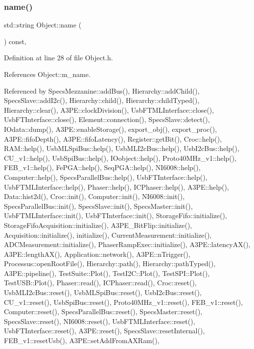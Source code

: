 \subsubsection{\texorpdfstring{name()}{name()}}
{\footnotesize\ttfamily std\+::string Object\+::name (\begin{DoxyParamCaption}{ }\end{DoxyParamCaption}) const\hspace{0.3cm}{\ttfamily [inline]}, {\ttfamily [inherited]}}



Definition at line 28 of file Object.\+h.



References Object\+::m\+\_\+name.



Referenced by Specs\+Mezzanine\+::add\+Bus(), Hierarchy\+::add\+Child(), Specs\+Slave\+::add\+I2c(), Hierarchy\+::child(), Hierarchy\+::child\+Typed(), Hierarchy\+::clear(), A3\+P\+E\+::clock\+Division(), Usb\+F\+T\+M\+L\+Interface\+::close(), Usb\+F\+T\+Interface\+::close(), Element\+::connection(), Specs\+Slave\+::detect(), I\+Odata\+::dump(), A3\+P\+E\+::enable\+Storage(), export\+\_\+obj(), export\+\_\+proc(), A3\+P\+E\+::fifo\+Depth(), A3\+P\+E\+::fifo\+Latency(), Register\+::get\+Bit(), Croc\+::help(), R\+A\+M\+::help(), Usb\+M\+L\+Spi\+Bus\+::help(), Usb\+M\+L\+I2c\+Bus\+::help(), Usb\+I2c\+Bus\+::help(), C\+U\+\_\+v1\+::help(), Usb\+Spi\+Bus\+::help(), I\+Oobject\+::help(), Proto40\+M\+Hz\+\_\+v1\+::help(), F\+E\+B\+\_\+v1\+::help(), Fe\+P\+G\+A\+::help(), Seq\+P\+G\+A\+::help(), N\+I6008\+::help(), Computer\+::help(), Specs\+Parallel\+Bus\+::help(), Usb\+F\+T\+Interface\+::help(), Usb\+F\+T\+M\+L\+Interface\+::help(), Phaser\+::help(), I\+C\+Phaser\+::help(), A3\+P\+E\+::help(), Data\+::hist2d(), Croc\+::init(), Computer\+::init(), N\+I6008\+::init(), Specs\+Parallel\+Bus\+::init(), Specs\+Slave\+::init(), Specs\+Master\+::init(), Usb\+F\+T\+M\+L\+Interface\+::init(), Usb\+F\+T\+Interface\+::init(), Storage\+Fifo\+::initialize(), Storage\+Fifo\+Acquisition\+::initialize(), A3\+P\+E\+\_\+\+Bit\+Flip\+::initialize(), Acquisition\+::initialize(), initialize(), Current\+Measurement\+::initialize(), A\+D\+C\+Measurement\+::initialize(), Phaser\+Ramp\+Exec\+::initialize(), A3\+P\+E\+::latency\+A\+X(), A3\+P\+E\+::length\+A\+X(), Application\+::network(), A3\+P\+E\+::n\+Trigger(), Processus\+::open\+Root\+File(), Hierarchy\+::path(), Hierarchy\+::path\+Typed(), A3\+P\+E\+::pipeline(), Test\+Suite\+::\+Plot(), Test\+I2\+C\+::\+Plot(), Test\+S\+P\+I\+::\+Plot(), Test\+U\+S\+B\+::\+Plot(), Phaser\+::read(), I\+C\+Phaser\+::read(), Croc\+::reset(), Usb\+M\+L\+I2c\+Bus\+::reset(), Usb\+M\+L\+Spi\+Bus\+::reset(), Usb\+I2c\+Bus\+::reset(), C\+U\+\_\+v1\+::reset(), Usb\+Spi\+Bus\+::reset(), Proto40\+M\+Hz\+\_\+v1\+::reset(), F\+E\+B\+\_\+v1\+::reset(), Computer\+::reset(), Specs\+Parallel\+Bus\+::reset(), Specs\+Master\+::reset(), Specs\+Slave\+::reset(), N\+I6008\+::reset(), Usb\+F\+T\+M\+L\+Interface\+::reset(), Usb\+F\+T\+Interface\+::reset(), A3\+P\+E\+::reset(), Specs\+Slave\+::reset\+Internal(), F\+E\+B\+\_\+v1\+::reset\+Usb(), A3\+P\+E\+::set\+Add\+From\+A\+X\+Ram(), 